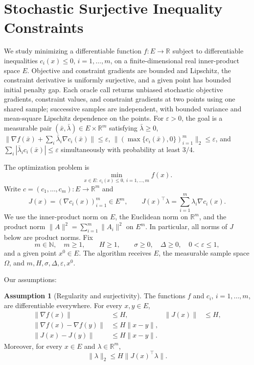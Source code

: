 \documentclass[10pt]{article}
\theoremstyle{definition}
\newtheorem{assumption}{Assumption}
\begin{document}
\section*{Stochastic Surjective Inequality Constraints}
We study minimizing a differentiable function $f:E\to\mathbb{R}$ subject to differentiable inequalities $c_i(x)\leq0$, $i=1,\ldots,m$, on a finite-dimensional real inner-product space $E$. Objective and constraint gradients are bounded and Lipschitz, the constraint derivative is uniformly surjective, and a given point has bounded initial penalty gap. Each oracle call returns unbiased stochastic objective gradients, constraint values, and constraint gradients at two points using one shared sample; successive samples are independent, with bounded variance and mean-square Lipschitz dependence on the points. For $\varepsilon>0$, the goal is a measurable pair $(\bar{x},\bar{\lambda})\in E\times\mathbb{R}^m$ satisfying $\bar{\lambda}\geq0$, $\|\nabla f(\bar{x})+\sum_i\bar{\lambda}_i\nabla c_i(\bar{x})\|\leq\varepsilon$, $\|(\max\{c_i(\bar{x}),0\})_{i=1}^m\|_2\leq\varepsilon$, and $\sum_i|\bar{\lambda}_ic_i(\bar{x})|\leq\varepsilon$ simultaneously with probability at least $3/4$.

The optimization problem is
\[
\min_{x\in E:\ c_i(x)\leq0,\ i=1,\ldots,m} f(x).
\]
Write $c=(c_1,\ldots,c_m):E\to\mathbb{R}^m$ and
\[
J(x)=(\nabla c_i(x))_{i=1}^m\in E^m,
\qquad
J(x)^\top\lambda=\sum_{i=1}^m\lambda_i\nabla c_i(x).
\]
We use the inner-product norm on $E$, the Euclidean norm on $\mathbb{R}^m$, and the product norm $\|A\|^2=\sum_{i=1}^m\|A_i\|^2$ on $E^m$. In particular, all norms of $J$ below are product norms. Fix
\[
m\in\mathbb{N},\quad m\geq1,\qquad H\geq1,\qquad
\sigma\geq0,\quad \Delta\geq0,\quad 0<\varepsilon\leq1,
\]
and a given point $x^0\in E$. The algorithm receives $E$, the measurable sample space $\Omega$, and $m,H,\sigma,\Delta,\varepsilon,x^0$.

Our assumptions:
\begin{assumption}[Regularity and surjectivity]
The functions $f$ and $c_i$, $i=1,\ldots,m$, are differentiable everywhere. For every $x,y\in E$,
\[
\begin{aligned}
\|\nabla f(x)\|&\leq H,& \|J(x)\|&\leq H,\\
\|\nabla f(x)-\nabla f(y)\|&\leq H\|x-y\|,\\
\|J(x)-J(y)\|&\leq H\|x-y\|.
\end{aligned}
\]
Moreover, for every $x\in E$ and $\lambda\in\mathbb{R}^m$,
\[
\|\lambda\|_2\leq H\|J(x)^\top\lambda\|.
\]
\end{assumption}
\end{document}

